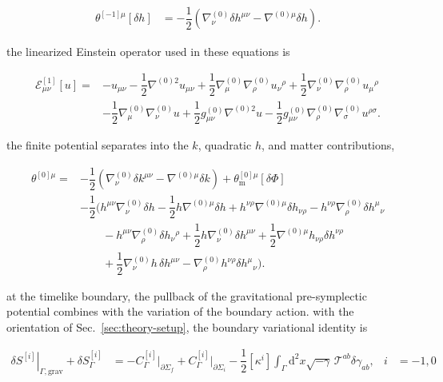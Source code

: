 \begin{align}
\theta ^{[-1]\mu}[\delta h] & =-\dfrac{1}{2}\left(\nabla ^{(0)}_{\nu}\delta h^{\mu \nu}-\nabla ^{(0)\mu}\delta h\right).
\end{align}

the linearized Einstein operator used in these equations is

\[\begin{aligned}
\mathcal{E}^{[1]}_{\mu \nu}[u] ={}&-u_{\mu \nu}-\dfrac{1}{2}\nabla ^{(0)2}u_{\mu \nu}+\dfrac{1}{2}\nabla ^{(0)}_{\mu}\nabla ^{(0)}_{\rho}u_{\nu}{}^{\rho}+\dfrac{1}{2}\nabla ^{(0)}_{\nu}\nabla ^{(0)}_{\rho}u_{\mu}{}^{\rho} \\
&-\dfrac{1}{2}\nabla ^{(0)}_{\mu}\nabla ^{(0)}_{\nu}u+\dfrac{1}{2}g_{\mu \nu}^{(0)}\nabla ^{(0)2}u-\dfrac{1}{2}g_{\mu \nu}^{(0)}\nabla ^{(0)}_{\rho}\nabla ^{(0)}_{\sigma}u^{\rho \sigma}.
\end{aligned}\]

the finite potential separates into the $\displaystyle{k}$, quadratic $\displaystyle{h}$, and matter contributions,

\[\begin{aligned}
\theta ^{[0]\mu} ={}&-\dfrac{1}{2}\left(\nabla ^{(0)}_{\nu}\delta k^{\mu \nu}-\nabla ^{(0)\mu}\delta k\right)+\theta _{\mathrm{m}}^{[0]\mu}[\delta \Phi] \\
&-\dfrac{1}{2}\bigg( h^{\mu \nu}\nabla ^{(0)}_{\nu}\delta h -\dfrac{1}{2}h\nabla ^{(0)\mu}\delta h +h^{\nu \rho}\nabla ^{(0)\mu}\delta h_{\nu \rho} -h^{\nu \rho}\nabla ^{(0)}_{\rho}\delta h^{\mu}{}_{\nu} \\
&\qquad-h^{\mu \nu}\nabla ^{(0)}_{\rho}\delta h_{\nu}{}^{\rho} +\dfrac{1}{2}h\nabla ^{(0)}_{\nu}\delta h^{\mu \nu} +\dfrac{1}{2}\nabla ^{(0)\mu}h_{\nu \rho}\delta h^{\nu \rho} \\
&\qquad+\dfrac{1}{2}\nabla ^{(0)}_{\nu}h\,\delta h^{\mu \nu} -\nabla ^{(0)}_{\rho}h^{\nu \rho}\delta h^{\mu}{}_{\nu}
\bigg).
\end{aligned}\]

at the timelike boundary, the pullback of the gravitational pre-symplectic potential combines with the variation of the boundary action. with the orientation of Sec.~\ref{sec:theory-setup}, the boundary variational identity is

\begin{align}
\left.\delta S^{[i]}\right|_{\Gamma,\mathrm{grav}}+\delta S_{\Gamma}^{[i]} &=-C_{\Gamma}^{[i]}\big|_{\partial\Sigma _{f}}+C_{\Gamma}^{[i]}\big|_{\partial\Sigma _{i}}-\dfrac{1}{2}\left[\kappa ^{i}\right]\int _{\Gamma}\mathrm{d}^{2}x\sqrt{-\gamma}\,\mathcal{T}^{ab}\delta\gamma _{ab}, & i&=-1,0
\end{align}

